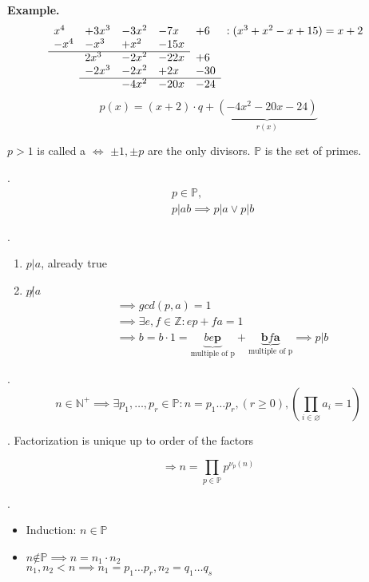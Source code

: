 \textbf{Example.}
\[
  \begin{array}{llllll}
    x^4 & + 3x^3 & - 3x^2 & - 7x  & +6  & : ( x^3 + x^2 - x + 15) = x+2 \\
    -x^4 & - x^3  & + x^2  & - 15x &     &\\
    \cline{1-4}
         &  2x^3  & - 2x^2 & - 22x & + 6 &\\
         & -2x^3  & - 2x^2 & + 2x  & -30 &\\
    \cline{2-5}
         &        & - 4x^2 & - 20x & -24 &\\
  \end{array}
\]
\[
  p(x) = (x+2) \cdot q + \underbrace{(-4x^2-20x-24)}_{r(x)}
\]

\begin{definition}
$p>1$ is called a  $\iff$ $\pm 1, \pm p$ are the only divisors. $\mathbb{P}$ is the set of primes.
\end{definition}

\Theorem.
\begin{align*}
  & p\in \mathbb{P}, \\
  & p|ab \implies p|a \vee p|b
\end{align*}

\Proof.
\begin{enumerate}[{Case} 1)]
  \item $p|a$, already true\\
  \item $p \not| a$
  \begin{align*}
    &\implies gcd(p,a) = 1 \\
    &\implies \exists e,f \in \mathbb{Z}: ep + fa = 1 \\
    &\implies b = b \cdot 1 =
      \underbrace{b e \mathbf{p}}_{\text{multiple of p}} +
      \underbrace{\mathbf{b} f \mathbf{a}}_{\text{multiple of p}} \implies p|b
  \end{align*}
\end{enumerate}
\Theorem.
\[
  n \in \mathbb{N}^{+} \implies \exists p_1, \ldots ,p_r \in \mathbb{P}: n = p_1 \ldots p_r, (r \geq 0), (\prod_{i\in \varnothing} a_i = 1)
\]

\Remark.
Factorization is unique up to order of the factors

\[
  \Rightarrow n = \prod_{p \in \mathbb{P}} p^{\nu_p(n)}
\]

\Proof.
\begin{itemize}

  \item Induction: $n ∈ \mathbb{P}$

  \item $n \not ∈ \mathbb{P} \implies n = n_1 \cdot n_2$\\
  $n_1, n_2 < n \implies n_1 = p_1 \dots p_r, n_2 = q_1  \dots q_s$

\end{itemize}

